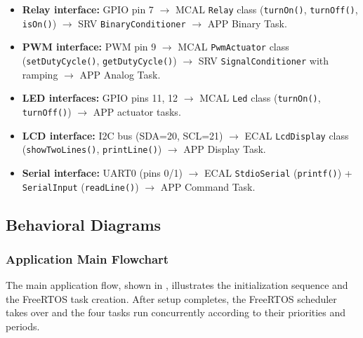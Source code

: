 \begin{itemize}
    \item \textbf{Relay interface:} GPIO pin 7 $\rightarrow$ MCAL \texttt{Relay} class (\texttt{turnOn()}, \texttt{turnOff()}, \texttt{isOn()}) $\rightarrow$ SRV \texttt{BinaryConditioner} $\rightarrow$ APP Binary Task.
    \item \textbf{PWM interface:} PWM pin 9 $\rightarrow$ MCAL \texttt{PwmActuator} class (\texttt{setDutyCycle()}, \texttt{getDutyCycle()}) $\rightarrow$ SRV \texttt{SignalConditioner} with ramping $\rightarrow$ APP Analog Task.
    \item \textbf{LED interfaces:} GPIO pins 11, 12 $\rightarrow$ MCAL \texttt{Led} class (\texttt{turnOn()}, \texttt{turnOff()}) $\rightarrow$ APP actuator tasks.
    \item \textbf{LCD interface:} I2C bus (SDA=20, SCL=21) $\rightarrow$ ECAL \texttt{LcdDisplay} class (\texttt{showTwoLines()}, \texttt{printLine()}) $\rightarrow$ APP Display Task.
    \item \textbf{Serial interface:} UART0 (pins 0/1) $\rightarrow$ ECAL \texttt{StdioSerial} (\texttt{printf()}) + \texttt{SerialInput} (\texttt{readLine()}) $\rightarrow$ APP Command Task.
\end{itemize}

\subsection{Behavioral Diagrams}

\subsubsection{Application Main Flowchart}

The main application flow, shown in , illustrates the initialization sequence and the FreeRTOS task creation. After setup completes, the FreeRTOS scheduler takes over and the four tasks run concurrently according to their priorities and periods.


